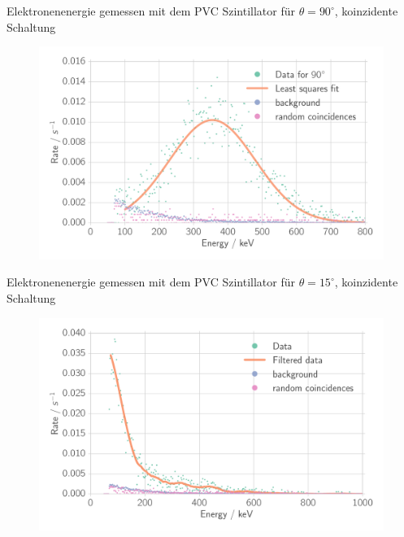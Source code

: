 \documentclass[xcolor=x11names,compress]{beamer}
\renewcommand{\(}{\begin{columns}}
\renewcommand{\)}{\end{columns}}
\newcommand{\<}[1]{\begin{column}{#1}}
\renewcommand{\>}{\end{column}}
\begin{document}
\begin{frame}[t]{Elektronenenergie gemessen mit dem PVC Szintillator für 
    $\theta = 90^\circ$, koinzidente Schaltung}
    \begin{figure}[htpb]
    \centering
    \includegraphics[width=1.0\linewidth]{../analysis/figures/coin_ps_90}
\label{fig:coin_ps_90}
\end{figure}
\end{frame}

\begin{frame}[t]{Elektronenenergie gemessen mit dem PVC Szintillator für 
    $\theta = 15^\circ$, koinzidente Schaltung}
\begin{figure}[htpb]
    \centering
    \includegraphics[width=1.0\linewidth]{../analysis/figures/coin_ps_15_filter_}
\label{fig:coin_ps_15}
\end{figure}
\end{frame}
\end{document}
